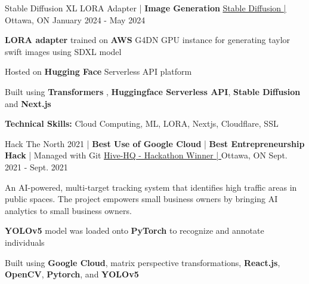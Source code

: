 \begin{cventries}
	\cventry
	{Stable Diffusion XL LORA Adapter | \textbf{Image Generation}}
	{\underline{\href{https://lefan.ca/silly-goose/image-gallery}{Stable Diffusion | \ExternalLink}}} %
	{Ottawa, ON} %
	{January 2024 - May 2024} %
	{
		\begin{cvitems} %
			\item {\textbf{LORA adapter} trained on \textbf{AWS} G4DN GPU instance for generating taylor swift images using SDXL model}
			\item {Hosted on \textbf{Hugging Face} Serverless API platform}
			\item {Built using \textbf{Transformers} , \textbf{Huggingface Serverless API}, \textbf{Stable Diffusion} and \textbf{Next.js}}
			\item {\textbf{Technical Skills:} Cloud Computing, ML, LORA, Nextjs, Cloudflare, SSL}
		\end{cvitems}
	}

	\cventry
	{Hack The North 2021 | \textbf{Best Use of Google Cloud} | \textbf{Best Entrepreneurship Hack} | Managed with Git} %
	{\underline{\href{https://devpost.com/software/hive-hq}{Hive-HQ - Hackathon Winner | \ExternalLink}}} %
	{Ottawa, ON} %
	{Sept. 2021 - Sept. 2021} %
	{
		\begin{cvitems} %
			\item {An AI-powered, multi-target tracking system that identifies high traffic areas in public spaces. The project empowers small business owners by bringing AI analytics to small business owners.}
			\item {\textbf{YOLOv5} model was loaded onto \textbf{PyTorch} to recognize and annotate individuals}
			\item {Built using \textbf{Google Cloud}, matrix perspective transformations, \textbf{React.js}, \textbf{OpenCV}, \textbf{Pytorch}, and \textbf{YOLOv5}}
		\end{cvitems}
	}



\end{cventries}
